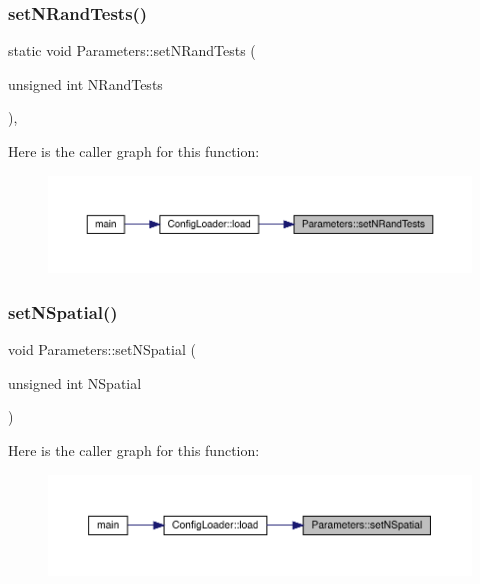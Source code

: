 \subsubsection{\texorpdfstring{setNRandTests()}{setNRandTests()}}
{\footnotesize\ttfamily static void Parameters\+::set\+N\+Rand\+Tests (\begin{DoxyParamCaption}\item[{unsigned int}]{N\+Rand\+Tests }\end{DoxyParamCaption})\hspace{0.3cm}{\ttfamily [inline]}, {\ttfamily [static]}}

Here is the caller graph for this function\+:\nopagebreak
\begin{figure}[H]
\begin{center}
\leavevmode
\includegraphics[width=350pt]{class_parameters_a24bd9c86cda80898bc65b950983b6a17_icgraph}
\end{center}
\end{figure}
\mbox{\label{class_parameters_a4b2041032efc8d6e9f99a99f87543f26}} 
\subsubsection{\texorpdfstring{setNSpatial()}{setNSpatial()}}
{\footnotesize\ttfamily void Parameters\+::set\+N\+Spatial (\begin{DoxyParamCaption}\item[{unsigned int}]{N\+Spatial }\end{DoxyParamCaption})\hspace{0.3cm}{\ttfamily [static]}}

Here is the caller graph for this function\+:\nopagebreak
\begin{figure}[H]
\begin{center}
\leavevmode
\includegraphics[width=350pt]{class_parameters_a4b2041032efc8d6e9f99a99f87543f26_icgraph}
\end{center}
\end{figure}
\mbox{\label{class_parameters_a8b9ea6055d41cd08a060bc72332a63af}} 
